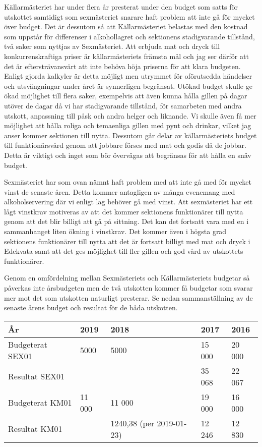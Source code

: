 \documentclass[../_main/handlingar.tex]{subfiles}
\begin{document}

    Källarmästeriet har under flera år presterat under den budget som satts för utskottet samtidigt som sexmästeriet snarare haft problem att inte gå för mycket över budget. Det är dessutom så att Källarmästeriet belastas med den kostnad som uppstår för differenser i alkohollagret och sektionens stadigvarande tillstånd, två saker som nyttjas av Sexmästeriet. Att erbjuda mat och dryck till konkurrenskraftiga priser är källarmästeriets främsta mål och jag ser därför att det är eftersträvansvärt att inte behöva höja priserna för att klara budgeten. Enligt gjorda kalkyler är detta möjligt men utrymmet för oförutsedda händelser och utsvängningar under året är synnerligen begränsat. Utökad budget skulle ge ökad möjlighet till flera saker, exempelvis att även kunna hålla gillen på dagar utöver de dagar då vi har stadigvarande tillstånd, för samarbeten med andra utskott, anpassning till påsk och andra helger och liknande. Vi skulle även få mer möjlighet att hålla roliga och temaenliga gillen med pynt och drinkar, vilket jag anser kommer sektionen till nytta. Dessutom går delar av källarmästeriets budget till funktionärsvård genom att jobbare förses med mat och godis då de jobbar. Detta är viktigt och inget som bör övervägas att begränsas för att hålla en snäv budget. 

Sexmästeriet har som ovan nämnt haft problem med att inte gå med för mycket vinst de senaste åren. Detta kommer antagligen av många evenemang med alkoholservering där vi enligt lag behöver gå med vinst. Att sexmästeriet har ett lågt vinstkrav motiveras av att det kommer sektionens funktionärer till nytta genom att det blir billigt att gå på sittning. Det kan det fortsatt vara med en i sammanhanget liten ökning i vinstkrav. Det kommer även i högsta grad sektionens funktionärer till nytta att det är fortsatt billigt med mat och dryck i Edekvata samt att det ges möjlighet till fler gillen och god vård av utskottets funktionärer.  

Genom en omfördelning mellan Sexmästeriets och Källarmästeriets budgetar så påverkas inte årsbudgeten men de två utskotten kommer få budgetar som svarar mer mot det som utskotten naturligt presterar. Se nedan sammanställning av de senaste årens budget och resultat för de båda utskotten.

\begin{tabular}{| l | l | l | l | l |}
    \hline
    År & 2019 & 2018 & 2017 & 2016  \\
    \hline
    Budgeterat SEX01  & 5000 & 5000 & 15 000 & 20 000  \\
    \hline
    Resultat SEX01 & & & 35 068 & 22 067\\
    \hline
    Budgeterat KM01 & 11 000 & 11 000 & 19 000 & 16 000\\
    \hline
    Resultat KM01 & & 1240,38 (per 2019-01-23) & 12 246 & 12 830\\
    \hline
 
 
\end{tabular}
\end{document}
